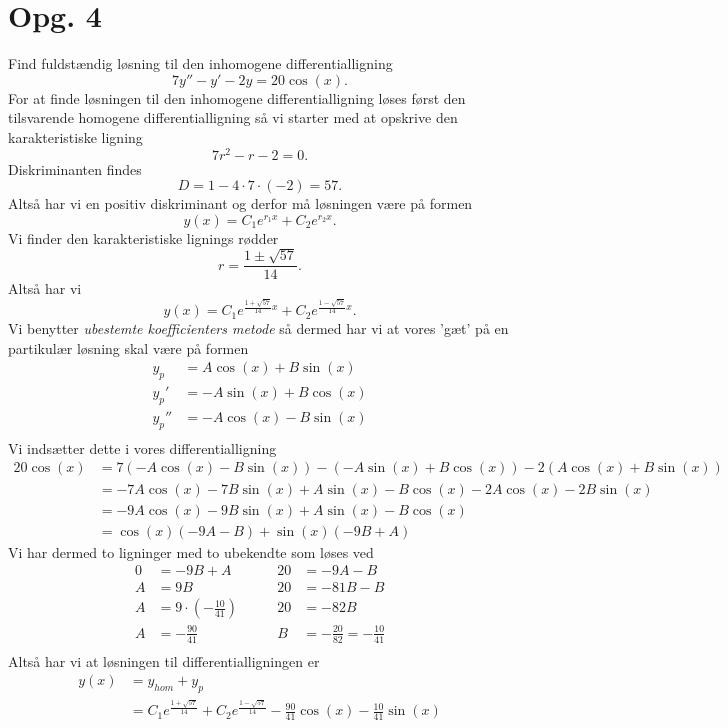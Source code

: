 \documentclass[12pt]{article}
\theoremstyle{definition}
\begin{document}
\section*{Opg. 4}
Find fuldstændig løsning til den inhomogene differentialligning
\[
7y'' - y' - 2y = 20 \cos \left( x \right) 
.\]
\bigbreak
For at finde løsningen til den inhomogene differentialligning løses først den tilsvarende homogene differentialligning så vi starter med at opskrive den karakteristiske ligning
\[
7r^2 - r - 2 = 0
.\]
Diskriminanten findes
\[
D = 1 - 4\cdot 7\cdot (-2) = 57
.\]
Altså har vi en positiv diskriminant og derfor må løsningen være på formen
\[
y(x) = C_1e^{r_1x} + C_2e^{r_2x} 
.\]
Vi finder den karakteristiske lignings rødder
\[
r = \frac{1 \pm \sqrt{57}}{14} 
.\]
Altså har vi
\[
y(x) = C_1 e^{ \frac{1+\sqrt{57}}{14}x} + C_2 e^{ \frac{1-\sqrt{57}}{14}x}  
.\]
Vi benytter \textit{ubestemte koefficienters metode} så dermed har vi at vores 'gæt' på en partikulær løsning skal være på formen
\begin{align*}
  y_p &= A \cos \left( x \right) + B \sin \left( x \right) \\
  y_p' &= -A \sin \left( x \right) + B \cos \left( x \right)  \\
  y_p'' &= -A \cos \left( x \right) - B \sin \left( x \right)   \\
\end{align*}
Vi indsætter dette i vores differentialligning
\begin{align*}
  20 \cos \left( x \right) &= 7\left( -A \cos \left( x \right) - B \sin \left( x \right)  \right)  - \left( -A \sin \left( x \right) + B \cos \left( x \right)  \right) - 2\left( A \cos \left( x \right) + B \sin \left( x \right)  \right) \\
  &= -7A \cos \left( x \right) - 7B \sin \left( x \right) + A \sin \left( x \right) - B \cos \left( x \right) - 2A \cos \left( x \right) - 2B \sin \left( x \right) \\
  &=  -9A \cos \left( x \right) - 9B \sin \left( x \right) + A \sin \left( x \right) - B \cos \left( x \right) \\
  &= \cos \left( x \right)\left( -9A - B \right) + \sin \left( x \right) \left( -9B + A \right) 
\end{align*}
Vi har dermed to ligninger med to ubekendte som løses ved
\begin{align*}
  0 &= -9B + A & \qquad 20 &= -9A - B \\
  A &= 9B & \qquad 20 &= -81B - B  \\
  A &= 9\cdot \left( -\frac{10}{41} \right) &\qquad 20 &= -82B \\
  A &= -\frac{90}{41} &\qquad B &= -\frac{20}{82} = -\frac{10}{41} \\
\end{align*}
Altså har vi at løsningen til differentialligningen er
\begin{align*}
  y(x) &= y_{hom} + y_p \\
  &= C_1e^{ \frac{1+\sqrt{57} }{14} } + C_2e^{ \frac{1-\sqrt{57} }{14} } - \frac{90}{41}\cos \left( x \right) - \frac{10}{41}\sin \left( x \right) 
\end{align*}
\end{document}
